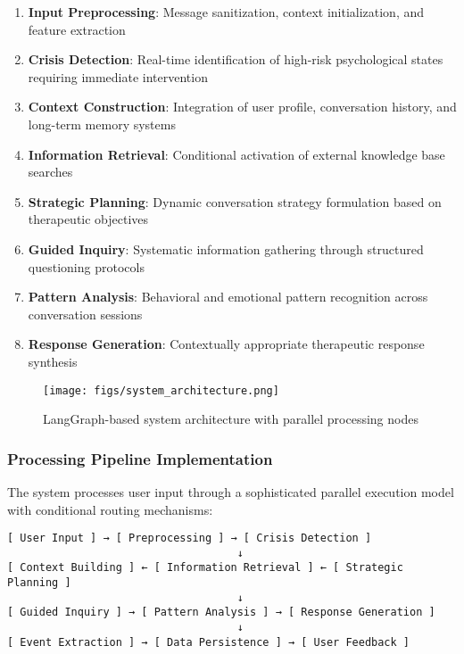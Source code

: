 \begin{enumerate}
\item \textbf{Input Preprocessing}: Message sanitization, context initialization, and feature extraction
\item \textbf{Crisis Detection}: Real-time identification of high-risk psychological states requiring immediate intervention
\item \textbf{Context Construction}: Integration of user profile, conversation history, and long-term memory systems
\item \textbf{Information Retrieval}: Conditional activation of external knowledge base searches
\item \textbf{Strategic Planning}: Dynamic conversation strategy formulation based on therapeutic objectives
\item \textbf{Guided Inquiry}: Systematic information gathering through structured questioning protocols
\item \textbf{Pattern Analysis}: Behavioral and emotional pattern recognition across conversation sessions
\item \textbf{Response Generation}: Contextually appropriate therapeutic response synthesis
\end{enumerate}

\begin{figure}[h]
\centering
\texttt{[image: figs/system\_architecture.png]}
\caption{LangGraph-based system architecture with parallel processing nodes}
\label{fig:system_architecture}
\end{figure}

\subsubsection{Processing Pipeline Implementation}

The system processes user input through a sophisticated parallel execution model with conditional routing mechanisms:

\begin{verbatim}
[ User Input ] → [ Preprocessing ] → [ Crisis Detection ]
                                    ↓
[ Context Building ] ← [ Information Retrieval ] ← [ Strategic Planning ]
                                    ↓
[ Guided Inquiry ] → [ Pattern Analysis ] → [ Response Generation ]
                                    ↓
[ Event Extraction ] → [ Data Persistence ] → [ User Feedback ]
\end{verbatim}


